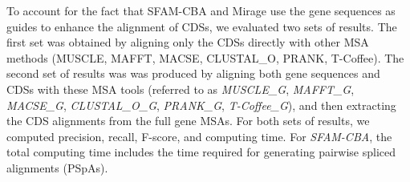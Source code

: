 \documentclass[12pt,oneside,letterpaper,english]{article}
\begin{document}
To account for the fact that SFAM-CBA and Mirage use the gene sequences as guides to enhance the alignment of CDSs, we evaluated two 
sets of results. The first set was obtained by aligning only the CDSs directly with other MSA methods (MUSCLE, MAFFT, MACSE, CLUSTAL\_O, 
PRANK, T-Coffee). The second set of results was was produced by aligning both gene sequences and CDSs with these MSA tools 
(referred to as \textit{MUSCLE\_G}, \textit{MAFFT\_G}, \textit{MACSE\_G}, \textit{CLUSTAL\_O\_G}, \textit{PRANK\_G}, \textit{T-Coffee\_G}), 
and then extracting the CDS alignments from the full gene MSAs. For both sets of results, we computed precision, recall, F-score, and 
computing time. For \textit{SFAM-CBA}, the total computing time includes the time required for generating pairwise spliced alignments (PSpAs).


\label{EndOfText}

\newpage
\listoffigures

\newpage
{}
\listoftables
\newpage
{}
%  

% 

\newpage



    
\end{document}
